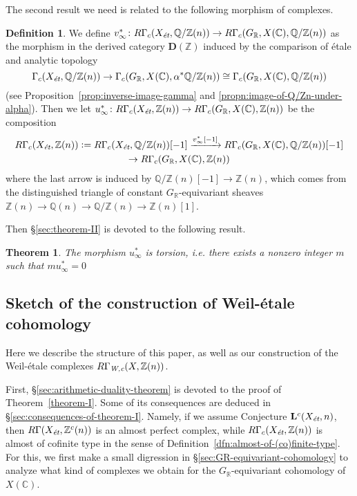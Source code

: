 \documentclass[leqno,12pt]{article}
\theoremstyle{plain}
\newtheorem{maintheorem}{Theorem}
\theoremstyle{definition}
\newtheorem{definition}[theorem]{\indent\sc Definition}
\newcommand{\CC}{\mathbb{C}}
\newcommand{\QQ}{\mathbb{Q}}
\newcommand{\RR}{\mathbb{R}}
\newcommand{\ZZ}{\mathbb{Z}}
\newcommand{\dfn}{\mathrel{\mathop:}=}
\newcommand{\Wc}{\text{\it W,c}}
\newcommand{\et}{\text{\it \'{e}t}}
\newcommand{\DZ}{{\mathbf{D} (\ZZ)}}
\begin{document}
The second result we need is related to the following morphism of complexes.

\begin{definition}
  \label{dfn:u-infty}
  We define
  $v_\infty^*\colon R\Gamma_c (X_\et, \QQ/\ZZ (n)) \to R\Gamma_c (G_\RR, X
  (\CC), \QQ/\ZZ (n))$ as the morphism in the derived category $\DZ$ induced by
  the comparison of \'{e}tale and analytic topology
  \[ \Gamma_c (X_\et, \QQ/\ZZ (n)) \to
  \Gamma_c (G_\RR, X (\CC), \alpha^* \QQ/\ZZ (n)) \cong
  \Gamma_c (G_\RR, X (\CC), \QQ/\ZZ (n)) \]
  (see Proposition~\ref{prop:inverse-image-gamma} and
  \ref{propn:image-of-Q/Zn-under-alpha}). Then we let
  $u_\infty^*\colon R\Gamma_c (X_\et, \ZZ(n)) \to R\Gamma_c (G_\RR, X (\CC), \ZZ (n))$
  be the composition
  \begin{multline*}
    R\Gamma_c (X_\et, \ZZ(n)) \dfn R\Gamma_c (X_\et, \QQ/\ZZ (n)) [-1]
    \xrightarrow{v_\infty^* [-1]} R\Gamma_c (G_\RR, X (\CC), \QQ/\ZZ (n)) [-1]
    \\ \to R\Gamma_c (G_\RR, X (\CC), \ZZ (n))
  \end{multline*}
  where the last arrow is induced by $\QQ/\ZZ (n) [-1] \to \ZZ (n)$, which comes
  from the distinguished triangle of constant $G_\RR$-equivariant sheaves
  $\ZZ (n) \to \QQ (n) \to \QQ/\ZZ (n) \to \ZZ (n) [1]$.
\end{definition}

Then \S\ref{sec:theorem-II} is devoted to the following result.

\begin{maintheorem}
  \label{theorem-II}
  The morphism $u_\infty^*$ is torsion, i.e. there exists a nonzero integer $m$
  such that $mu^*_\infty = 0$
\end{maintheorem}

\subsection*{Sketch of the construction of Weil-\'{e}tale cohomology}

Here we describe the structure of this paper, as well as our construction of the
Weil-\'{e}tale complexes $R\Gamma_\Wc (X, \ZZ (n))$.

First, \S\ref{sec:arithmetic-duality-theorem} is devoted to the proof of
Theorem~\ref{theorem-I}. Some of its consequences are deduced in
\S\ref{sec:consequences-of-theorem-I}. Namely, if we assume Conjecture
$\mathbf{L}^c (X_\et, n)$, then $R\Gamma (X_\et, \ZZ^c (n))$ is an almost
perfect complex, while $R\Gamma_c (X_\et, \ZZ (n))$ is almost of cofinite type
in the sense of Definition~\ref{dfn:almost-of-(co)finite-type}. For this, we
first make a small digression in \S\ref{sec:GR-equivariant-cohomology} to
analyze what kind of complexes we obtain for the $G_\RR$-equivariant cohomology
of $X (\CC)$.
\end{document}
